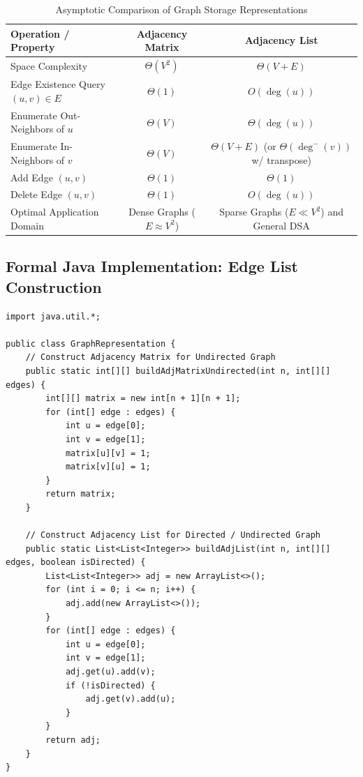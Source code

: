 \documentclass[10pt,journal,compsoc,onecolumn]{IEEEtran}
\begin{document}
\begin{table}[htbp]
\caption{Asymptotic Comparison of Graph Storage Representations}
\label{tab:rep_comparison}
\centering
\begin{tabular}{lcc}
\toprule
\textbf{Operation / Property} & \textbf{Adjacency Matrix} & \textbf{Adjacency List} \\
\midrule
Space Complexity & $\Theta(V^2)$ & $\Theta(V + E)$ \\
Edge Existence Query $(u, v) \in E$ & $\Theta(1)$ & $O(\deg(u))$ \\
Enumerate Out-Neighbors of $u$ & $\Theta(V)$ & $\Theta(\deg(u))$ \\
Enumerate In-Neighbors of $v$ & $\Theta(V)$ & $\Theta(V + E)$ (or $\Theta(\deg^-(v))$ w/ transpose) \\
Add Edge $(u, v)$ & $\Theta(1)$ & $\Theta(1)$ \\
Delete Edge $(u, v)$ & $\Theta(1)$ & $O(\deg(u))$ \\
Optimal Application Domain & Dense Graphs ($E \approx V^2$) & Sparse Graphs ($E \ll V^2$) and General DSA \\
\bottomrule
\end{tabular}
\end{table}

\subsection{Formal Java Implementation: Edge List Construction}

\begin{verbatim}
import java.util.*;

public class GraphRepresentation {
    // Construct Adjacency Matrix for Undirected Graph
    public static int[][] buildAdjMatrixUndirected(int n, int[][] edges) {
        int[][] matrix = new int[n + 1][n + 1];
        for (int[] edge : edges) {
            int u = edge[0];
            int v = edge[1];
            matrix[u][v] = 1;
            matrix[v][u] = 1;
        }
        return matrix;
    }

    // Construct Adjacency List for Directed / Undirected Graph
    public static List<List<Integer>> buildAdjList(int n, int[][] edges, boolean isDirected) {
        List<List<Integer>> adj = new ArrayList<>();
        for (int i = 0; i <= n; i++) {
            adj.add(new ArrayList<>());
        }
        for (int[] edge : edges) {
            int u = edge[0];
            int v = edge[1];
            adj.get(u).add(v);
            if (!isDirected) {
                adj.get(v).add(u);
            }
        }
        return adj;
    }
}
\end{verbatim}
\end{document}
